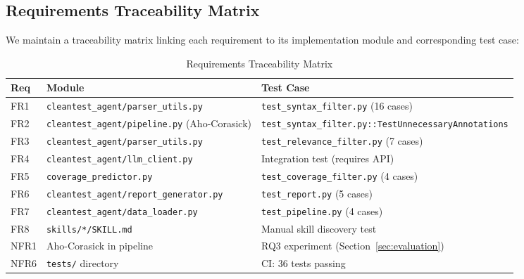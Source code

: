 \documentclass[acmlarge,nonacm,screen]{acmart}
\begin{document}
\subsection{Requirements Traceability Matrix}

We maintain a traceability matrix linking each requirement to its implementation module and corresponding test case:

\begin{table}[htbp]
\caption{Requirements Traceability Matrix}
\label{tab:traceability}
\begin{tabular}{@{}p{0.7cm}>{\raggedright\arraybackslash}p{5.6cm}>{\raggedright\arraybackslash}p{6.8cm}@{}}
\toprule
\textbf{Req} & \textbf{Module} & \textbf{Test Case} \\
\midrule
FR1  & \texttt{cleantest\_agent/\allowbreak parser\_utils.py}    & \texttt{test\_syntax\_filter.py} (16 cases) \\
FR2  & \texttt{cleantest\_agent/\allowbreak pipeline.py} (Aho-Corasick) & \texttt{test\_syntax\_filter.py::}\allowbreak\texttt{TestUnnecessaryAnnotations} \\
FR3  & \texttt{cleantest\_agent/\allowbreak parser\_utils.py}    & \texttt{test\_relevance\_filter.py} (7 cases) \\
FR4  & \texttt{cleantest\_agent/\allowbreak llm\_client.py}      & Integration test (requires API) \\
FR5  & \texttt{coverage\_predictor.py}               & \texttt{test\_coverage\_filter.py} (4 cases) \\
FR6  & \texttt{cleantest\_agent/\allowbreak report\_generator.py}& \texttt{test\_report.py} (5 cases) \\
FR7  & \texttt{cleantest\_agent/\allowbreak data\_loader.py}     & \texttt{test\_pipeline.py} (4 cases) \\
FR8  & \texttt{skills/*/SKILL.md}                    & Manual skill discovery test \\
NFR1 & Aho-Corasick in pipeline                       & RQ3 experiment (Section~\ref{sec:evaluation}) \\
NFR6 & \texttt{tests/} directory                      & CI: 36 tests passing \\
\bottomrule
\end{tabular}
\end{table}
\end{document}
